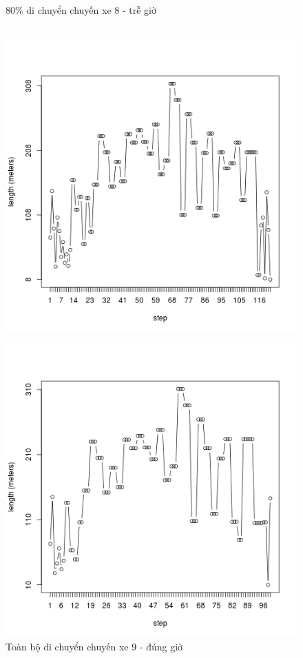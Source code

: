 \documentclass[a4paper, 13pt]{report}
\begin{document}
\begin{figure}[!htb]
  \caption*{80\% di chuyển chuyến xe 8 - trễ giờ}
\endminipage\\
  \includegraphics[width=\linewidth]{test_100_9}
  \caption*{Toàn bộ di chuyển chuyến xe 9 - đúng giờ}
\endminipage
{}
  \includegraphics[width=\linewidth]{test_80_9}

\end{figure}
\end{document}

